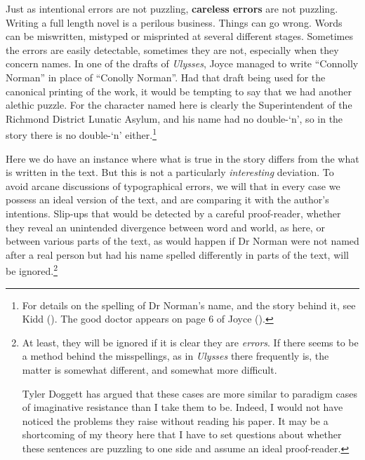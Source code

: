 \documentclass[
  11pt,
  letterpaper,
  DIV=11,
  numbers=noendperiod,
  twoside]{scrartcl}
\begin{document}
Just as intentional errors are not puzzling, \textbf{careless errors}
are not puzzling. Writing a full length novel is a perilous business.
Things can go wrong. Words can be miswritten, mistyped or misprinted at
several different stages. Sometimes the errors are easily detectable,
sometimes they are not, especially when they concern names. In one of
the drafts of \emph{Ulysses}, Joyce managed to write ``Connolly Norman''
in place of ``Conolly Norman''. Had that draft being used for the
canonical printing of the work, it would be tempting to say that we had
another alethic puzzle. For the character named here is clearly the
Superintendent of the Richmond District Lunatic Asylum, and his name had
no double-`n', so in the story there is no double-`n' either.\footnote{For
  details on the spelling of Dr Norman's name, and the story behind it,
  see Kidd (). The good doctor appears on
  page 6 of Joyce ().}

Here we do have an instance where what is true in the story differs from
the what is written in the text. But this is not a particularly
\emph{interesting} deviation. To avoid arcane discussions of
typographical errors, we will that in every case we possess an ideal
version of the text, and are comparing it with the author's intentions.
Slip-ups that would be detected by a careful proof-reader, whether they
reveal an unintended divergence between word and world, as here, or
between various parts of the text, as would happen if Dr Norman were not
named after a real person but had his name spelled differently in parts
of the text, will be ignored.\footnote{At least, they will be ignored if
  it is clear they are \emph{errors}. If there seems to be a method
  behind the misspellings, as in \emph{Ulysses} there frequently is, the
  matter is somewhat different, and somewhat more difficult.

  Tyler Doggett has argued that these cases are more similar to paradigm
  cases of imaginative resistance than I take them to be. Indeed, I
  would not have noticed the problems they raise without reading his
  paper. It may be a shortcoming of my theory here that I have to set
  questions about whether these sentences are puzzling to one side and
  assume an ideal proof-reader.}
\end{document}
